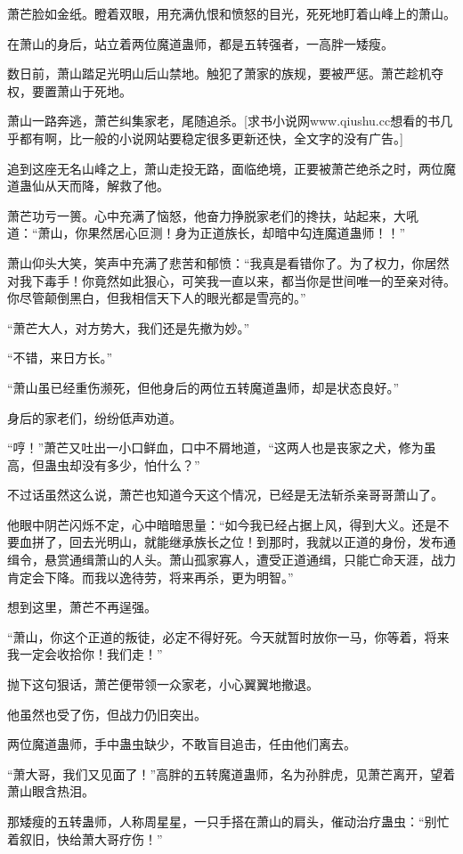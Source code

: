 \begin{this_body}
萧芒脸如金纸。瞪着双眼，用充满仇恨和愤怒的目光，死死地盯着山峰上的萧山。

在萧山的身后，站立着两位魔道蛊师，都是五转强者，一高胖一矮瘦。

数日前，萧山踏足光明山后山禁地。触犯了萧家的族规，要被严惩。萧芒趁机夺权，要置萧山于死地。

萧山一路奔逃，萧芒纠集家老，尾随追杀。[求书小说网www.qiushu.cc想看的书几乎都有啊，比一般的小说网站要稳定很多更新还快，全文字的没有广告。]

追到这座无名山峰之上，萧山走投无路，面临绝境，正要被萧芒绝杀之时，两位魔道蛊仙从天而降，解救了他。

萧芒功亏一篑。心中充满了恼怒，他奋力挣脱家老们的搀扶，站起来，大吼道：“萧山，你果然居心叵测！身为正道族长，却暗中勾连魔道蛊师！！”

萧山仰头大笑，笑声中充满了悲苦和郁愤：“我真是看错你了。为了权力，你居然对我下毒手！你竟然如此狠心，可笑我一直以来，都当你是世间唯一的至亲对待。你尽管颠倒黑白，但我相信天下人的眼光都是雪亮的。”

“萧芒大人，对方势大，我们还是先撤为妙。”

“不错，来日方长。”

“萧山虽已经重伤濒死，但他身后的两位五转魔道蛊师，却是状态良好。”

身后的家老们，纷纷低声劝道。

“哼！”萧芒又吐出一小口鲜血，口中不屑地道，“这两人也是丧家之犬，修为虽高，但蛊虫却没有多少，怕什么？”

不过话虽然这么说，萧芒也知道今天这个情况，已经是无法斩杀亲哥哥萧山了。

他眼中阴芒闪烁不定，心中暗暗思量：“如今我已经占据上风，得到大义。还是不要血拼了，回去光明山，就能继承族长之位！到那时，我就以正道的身份，发布通缉令，悬赏通缉萧山的人头。萧山孤家寡人，遭受正道通缉，只能亡命天涯，战力肯定会下降。而我以逸待劳，将来再杀，更为明智。”

想到这里，萧芒不再逞强。

“萧山，你这个正道的叛徒，必定不得好死。今天就暂时放你一马，你等着，将来我一定会收拾你！我们走！”

抛下这句狠话，萧芒便带领一众家老，小心翼翼地撤退。

他虽然也受了伤，但战力仍旧突出。

两位魔道蛊师，手中蛊虫缺少，不敢盲目追击，任由他们离去。

“萧大哥，我们又见面了！”高胖的五转魔道蛊师，名为孙胖虎，见萧芒离开，望着萧山眼含热泪。

那矮瘦的五转蛊师，人称周星星，一只手搭在萧山的肩头，催动治疗蛊虫：“别忙着叙旧，快给萧大哥疗伤！”


\end{this_body}
